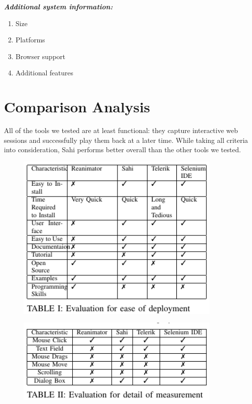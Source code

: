 \documentclass[12pt,journal]{IEEEtran}
\begin{document}
\textbf{\textit{Additional system information:}}
\begin{enumerate}
\item Size
\item Platforms
\item Browser support
\item Additional features\\
\end{enumerate}


\section{Comparison Analysis}
All of the tools we tested are at least functional: they capture interactive web sessions and successfully play them back at a later time. While taking all criteria into consideration, Sahi performs better overall than the other tools we tested.
\begin{figure}[h]
\centering
 \hfill\includegraphics[width=10cm]{figures/table1.PNG}\hspace*{\fill}
\end{figure}
\begin{figure}[h!]
\centering
 \hfill\includegraphics[width=10cm]{figures/table2.PNG}\hspace*{\fill}
\end{figure}
\end{document}
